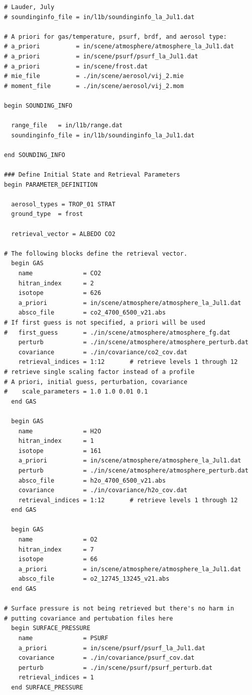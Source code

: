\documentclass{article}
\begin{document}
\begin{verbatim}
# Lauder, July
# soundinginfo_file = in/l1b/soundinginfo_la_Jul1.dat

# A priori for gas/temperature, psurf, brdf, and aerosol type:
# a_priori          = in/scene/atmosphere/atmosphere_la_Jul1.dat
# a_priori          = in/scene/psurf/psurf_la_Jul1.dat
# a_priori          = in/scene/frost.dat
# mie_file          = ./in/scene/aerosol/vij_2.mie
# moment_file       = ./in/scene/aerosol/vij_2.mom

begin SOUNDING_INFO

  range_file   = in/l1b/range.dat
  soundinginfo_file = in/l1b/soundinginfo_la_Jul1.dat

end SOUNDING_INFO

### Define Initial State and Retrieval Parameters
begin PARAMETER_DEFINITION

  aerosol_types = TROP_01 STRAT 
  ground_type  = frost

  retrieval_vector = ALBEDO CO2

# The following blocks define the retrieval vector.
  begin GAS
    name              = CO2
    hitran_index      = 2
    isotope           = 626
    a_priori          = in/scene/atmosphere/atmosphere_la_Jul1.dat
    absco_file        = co2_4700_6500_v21.abs
# If first guess is not specified, a priori will be used
#   first_guess       = ./in/scene/atmosphere/atmosphere_fg.dat
    perturb           = ./in/scene/atmosphere/atmosphere_perturb.dat
    covariance        = ./in/covariance/co2_cov.dat
    retrieval_indices = 1:12       # retrieve levels 1 through 12
# retrieve single scaling factor instead of a profile
# A priori, initial guess, perturbation, covariance
#    scale_parameters = 1.0 1.0 0.01 0.1   
  end GAS

  begin GAS
    name              = H2O
    hitran_index      = 1
    isotope           = 161
    a_priori          = in/scene/atmosphere/atmosphere_la_Jul1.dat
    perturb           = ./in/scene/atmosphere/atmosphere_perturb.dat
    absco_file        = h2o_4700_6500_v21.abs
    covariance        = ./in/covariance/h2o_cov.dat
    retrieval_indices = 1:12       # retrieve levels 1 through 12
  end GAS

  begin GAS
    name              = O2
    hitran_index      = 7
    isotope           = 66
    a_priori          = in/scene/atmosphere/atmosphere_la_Jul1.dat
    absco_file        = o2_12745_13245_v21.abs
  end GAS

# Surface pressure is not being retrieved but there's no harm in
# putting covariance and pertubation files here
  begin SURFACE_PRESSURE
    name              = PSURF
    a_priori          = in/scene/psurf/psurf_la_Jul1.dat
    covariance        = ./in/covariance/psurf_cov.dat
    perturb           = ./in/scene/psurf/psurf_perturb.dat
    retrieval_indices = 1
  end SURFACE_PRESSURE


\end{verbatim}
\end{document}
